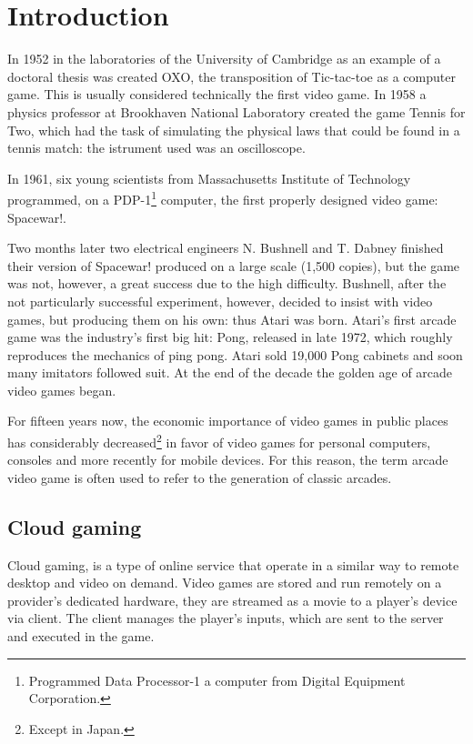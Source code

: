 \chapter{Introduction}
\label{cap:introduction}
In 1952 in the laboratories of the University of Cambridge as an example of a doctoral thesis was created OXO, the transposition of Tic-tac-toe as a computer game. This is usually considered technically the first video game. In 1958 a physics professor at Brookhaven National Laboratory created the game Tennis for Two, which had the task of simulating the physical laws that could be found in a tennis match: the istrument used was an oscilloscope.

In 1961, six young scientists from Massachusetts Institute of Technology programmed, on a PDP-1\footnote{Programmed Data Processor-1 a computer from Digital Equipment Corporation.} computer, the first properly designed video game: Spacewar!.

Two months later two electrical engineers N. Bushnell and T. Dabney finished their version of Spacewar! produced on a large scale (1,500 copies), but the game was not, however, a great success due to the high difficulty. Bushnell, after the not particularly successful experiment, however, decided to insist with video games, but producing them on his own: thus Atari was born. Atari's first arcade game was the industry's first big hit: Pong, released in late 1972, which roughly reproduces the mechanics of ping pong. Atari sold 19,000 Pong cabinets and soon many imitators followed suit. At the end of the decade the golden age of arcade video games began.

For fifteen years now, the economic importance of video games in public places has considerably decreased\footnote{Except in Japan.} in favor of video games for personal computers, consoles and more recently for mobile devices. For this reason, the term arcade video game is often used to refer to the generation of classic arcades\cite{High_Score}.

\section{Cloud gaming}
Cloud gaming, is a type of online service that operate in a similar way to remote desktop and video on demand. Video games are stored and run remotely on a provider's dedicated hardware, they are streamed as a movie to a player's device via client. The client manages the player's inputs, which are sent to the server and executed in the game.

